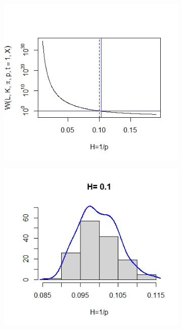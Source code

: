 \documentclass{article}
\begin{document}
\begin{figure}[htbp]
    \centering
    
    \begin{subfigure}{0.48\textwidth}
        \includegraphics[width=\linewidth]{H01_2000_1.jpeg}
    \end{subfigure}
    \hfill
    \begin{subfigure}{0.48\textwidth}
        \includegraphics[width=\linewidth]{H01_2000_2.jpeg}
    \end{subfigure}
    

\end{figure}
\end{document}

